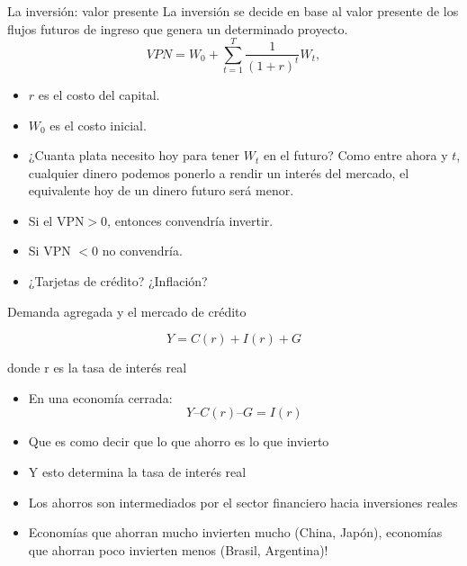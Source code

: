 \documentclass{beamer}
\begin{document}
\begin{frame}{La inversión: valor presente}
    La inversión se decide en base al valor presente de los flujos futuros de ingreso que genera un determinado proyecto.
    \begin{equation}
        VPN = W_0 + \sum_{t=1} ^{T} \frac{1}{(1+r)^t} W_t,
    \end{equation}
    \begin{itemize}
        \item $r$ es el costo del capital.
        \item $W_0$ es el costo inicial.
        \item ¿Cuanta plata necesito hoy para tener $W_t$ en el futuro? Como entre ahora y $t$, cualquier dinero podemos ponerlo a rendir un interés del mercado, el equivalente hoy de un dinero futuro será menor.
        \item Si el VPN$>0$, entonces convendría invertir.
        \item Si VPN $<0$ no convendría.
        \item ¿Tarjetas de crédito? ¿Inflación?
    \end{itemize}
\end{frame}

\begin{frame}{Demanda agregada y el mercado de crédito}

$$ Y = C(r) + I(r) + G $$

\centering \small{donde r es la tasa de interés real}

\begin{itemize}
\item En una economía cerrada:
$$ Y – C(r) – G = I(r) $$
\end{itemize}
\begin{itemize}
\item Que es como decir que lo que ahorro es lo que invierto
\item Y esto determina la tasa de interés real
\item Los ahorros son intermediados por el sector financiero hacia inversiones reales
\item Economías que ahorran mucho invierten mucho (China, Japón), economías que ahorran poco invierten menos (Brasil, Argentina)! 
\end{itemize}
\end{frame}
\end{document}
